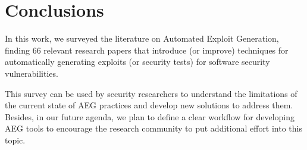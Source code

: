 \section{Conclusions}
\label{sec:conclusions}

In this work, we surveyed the literature on Automated Exploit Generation, finding 66 relevant research papers that introduce (or improve) techniques for automatically generating exploits (or security tests) for software security vulnerabilities.

This survey can be used by security researchers to understand the limitations of the current state of AEG practices and develop new solutions to address them.
Besides, in our future agenda, we plan to define a clear workflow for developing AEG tools to encourage the research community to put additional effort into this topic.
